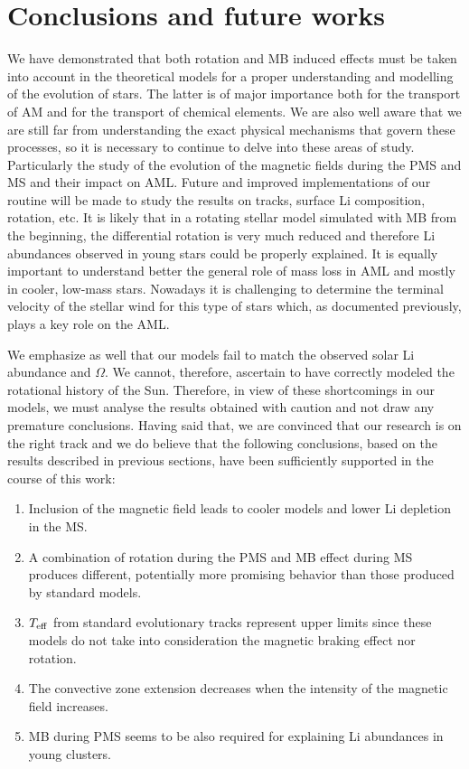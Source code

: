 \documentclass[fleqn,usenatbib]{mnras}
\begin{document}
{{\section{Conclusions and future works} \label{sec_4}
We have demonstrated that both rotation and MB induced effects must be taken into account in the theoretical models for a proper understanding and modelling of the evolution of stars. The latter is of major importance both for the transport of AM and for the transport of chemical elements. We are also well aware that we are still far from understanding the exact physical mechanisms that govern these processes, so it is necessary to continue to delve into these areas of study. Particularly the study of the evolution of the magnetic fields during the PMS and MS and their impact on AML. Future and improved implementations of our routine will be made to study the results on tracks, surface Li composition, rotation, etc. It is likely that in a rotating stellar model simulated with MB from the beginning, the differential rotation is very much reduced and therefore Li abundances observed in young stars could be properly explained. It is equally important to understand better the general role of mass loss in AML and mostly in cooler, low-mass stars. Nowadays it is challenging to determine the terminal velocity of the stellar wind for this type of stars which, as documented previously, plays a key role on the AML.\par

We emphasize as well that our models fail to match the observed solar Li abundance and $\Omega$. We cannot, therefore, ascertain to have correctly modeled the rotational history of the Sun. Therefore, in view of these shortcomings in our models, we must analyse the results obtained with caution and not draw any premature conclusions. Having said that, we are convinced that our research is on the right track and we do believe that the following conclusions, based on the results described in previous sections, have been sufficiently supported in the course of this work:
\begin{enumerate}
    \item Inclusion of the magnetic field leads to cooler models and lower Li depletion in the MS.
    \item A combination of rotation during the PMS and MB effect during MS produces different, potentially more promising behavior than those produced by standard models.
    \item $T_{\mathrm{eff}}$ from standard evolutionary tracks represent upper limits since these models do not take into consideration the magnetic braking effect nor rotation.
    \item The convective zone extension decreases when the intensity of the magnetic field increases.
    \item MB during PMS seems to be also required for explaining Li abundances in young clusters.
\end{enumerate}

}}
\end{document}
